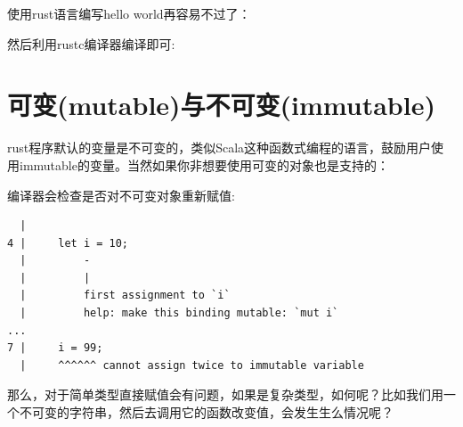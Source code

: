 \documentclass[12pt]{article}
\begin{document}
\makeblogtitle

使用rust语言编写hello world再容易不过了：

\begin{Shaded}
\begin{Highlighting}[]
\OperatorTok{\{}
    \NormalTok{(}\NormalTok{)}\OperatorTok{;}
\OperatorTok{\}}
\end{Highlighting}
\end{Shaded}

然后利用rustc编译器编译即可:

\begin{Shaded}
\begin{Highlighting}[]
\KeywordTok{\&\&} 
\end{Highlighting}
\end{Shaded}

\section{可变(mutable)与不可变(immutable)}\label{ux53efux53d8mutableux4e0eux4e0dux53efux53d8immutable}

rust程序默认的变量是不可变的，类似Scala这种函数式编程的语言，鼓励用户使用immutable的变量。当然如果你非想要使用可变的对象也是支持的：

\begin{Shaded}
\begin{Highlighting}[]
\OperatorTok{=} \OperatorTok{;} 
 \OperatorTok{=} \OperatorTok{;}
\end{Highlighting}
\end{Shaded}

编译器会检查是否对不可变对象重新赋值:

\begin{verbatim}
  |
4 |     let i = 10;
  |         -
  |         |
  |         first assignment to `i`
  |         help: make this binding mutable: `mut i`
...
7 |     i = 99;
  |     ^^^^^^ cannot assign twice to immutable variable
\end{verbatim}

那么，对于简单类型直接赋值会有问题，如果是复杂类型，如何呢？比如我们用一个不可变的字符串，然后去调用它的函数改变值，会发生生么情况呢？
\end{document}
